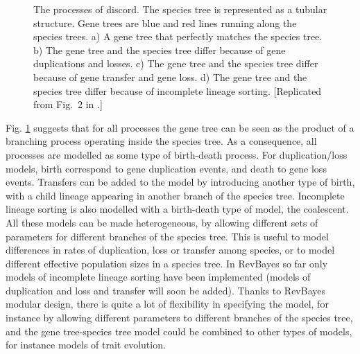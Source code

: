 \documentclass[11pt]{article}
\begin{document}
\begin{figure}[h!]
\centering
{}
\caption{\small The processes of discord. The species tree is represented as a tubular structure. Gene trees are blue and red lines running along the species trees. a) A gene tree that perfectly matches the species tree. b) The gene tree and the species tree differ because of gene duplications and losses. c)  The gene tree and the species tree differ because of gene transfer and gene loss. d)  The gene tree and the species tree differ because of incomplete lineage sorting.   [Replicated from Fig.~2 in \citet{Boussau2009}.]}
\label{fig1}
\end{figure}

Fig. \ref{fig1} suggests that for all processes the gene tree can be seen as the product of a branching process operating inside the species tree.
As a consequence, all processes are modelled as some type of birth-death process.
For duplication/loss models, birth correspond to gene duplication events, and death to gene loss events.
Transfers can be added to the model by introducing another type of birth, with a child lineage appearing in another branch of the species tree.
Incomplete lineage sorting is also modelled with a birth-death type of model, the coalescent.
All these models can be made heterogeneous, by allowing different sets of parameters for different branches of the species tree.
This is useful to model differences in rates of duplication, loss or transfer among species, or to model different effective population sizes in a species tree.
In RevBayes so far only models of incomplete lineage sorting have been implemented (models of duplication and loss and transfer will soon be added).
Thanks to RevBayes modular design, there is quite a lot of flexibility in specifying the model, for instance by allowing different parameters to different branches of the species tree, and the gene tree-species tree model could be combined to other types of models, for instance models of trait evolution.
\end{document}
